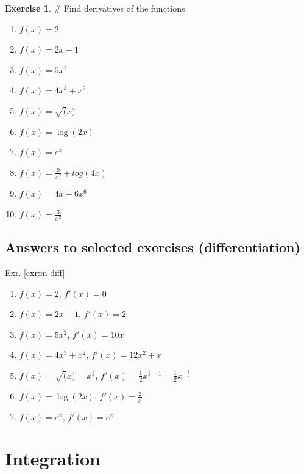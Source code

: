 \documentclass[
]{book}
\providecommand{\tightlist}{%
  \setlength{\itemsep}{0pt}\setlength{\parskip}{0pt}}
\theoremstyle{definition}
\theoremstyle{definition}
\theoremstyle{definition}
\newtheorem{exercise}{Exercise}[chapter]
\theoremstyle{remark}
\begin{document}
\begin{exercise}
\protect\hypertarget{exr:m-diff}{}{\label{exr:m-diff} }
\# Find derivatives of the functions

\begin{enumerate}
\def\labelenumi{\alph{enumi})}
\tightlist
\item
  \(f(x) = 2\)
\item
  \(f(x) = 2x + 1\)
\item
  \(f(x) = 5x^2\)
\item
  \(f(x) = 4x^3 + x^2\)
\item
  \(f(x) = \sqrt(x)\)
\item
  \(f(x) = \log(2x)\)
\item
  \(f(x) = e^{x}\)
\item
  \(f(x) = \frac{9}{x^2} + log(4x)\)
\item
  \(f(x) = 4x−6x^6\)
\item
  \(f(x) = \frac{3}{x^2}\)
\end{enumerate}
\end{exercise}

\hypertarget{answers-to-selected-exercises-differentiation}{%
\section*{Answers to selected exercises (differentiation)}\label{answers-to-selected-exercises-differentiation}}

Exr. \ref{exr:m-diff}

\begin{enumerate}
\def\labelenumi{\alph{enumi})}
\tightlist
\item
  \(f(x) = 2\), \(f'(x) = 0\)
\item
  \(f(x) = 2x + 1\), \(f'(x) = 2\)
\item
  \(f(x) = 5x^2\), \(f'(x)= 10x\)
\item
  \(f(x) = 4x^3 + x^2\), \(f'(x)=12x^2 + x\)
\item
  \(f(x) = \sqrt(x) = x^{\frac{1}{2}}\), \(f'(x)=\frac{1}{2}x^{\frac{1}{2}-1} = \frac{1}{2}x^{-\frac{1}{2}}\)
\item
  \(f(x) = \log(2x)\), \(f'(x) = \frac{2}{x}\)
\item
  \(f(x) = e^{x}\), \(f'(x) = e^x\)
\end{enumerate}

\hypertarget{integration}{%
\chapter{Integration}\label{integration}}
\end{document}
